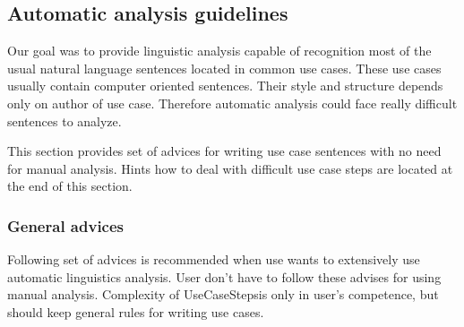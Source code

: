 \subsection{Automatic analysis guidelines}

Our goal was to provide linguistic analysis capable of recognition most of the usual natural language sentences located in common use cases. These use cases usually contain computer oriented sentences. Their style and structure depends only on author of use case. Therefore automatic analysis could face really difficult sentences to analyze.

This section provides set of advices for writing use case sentences with no need for manual analysis. Hints how to deal with difficult use case steps are located at the end of this section.

\subsubsection{General advices}
Following set of advices is recommended when use wants to extensively use automatic linguistics analysis. User don't have to follow these advises for using manual analysis. Complexity of UseCaseStepsis only in user's competence, but should keep general rules for writing use cases. 

